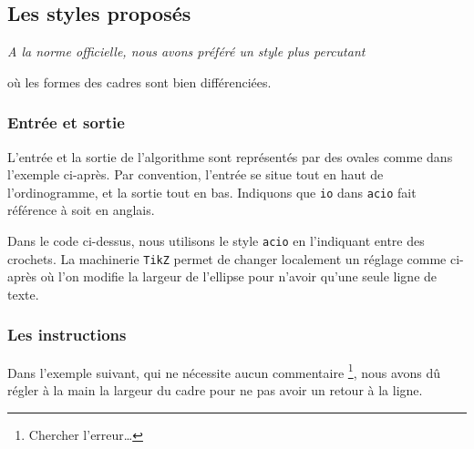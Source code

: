 \documentclass[12pt,a4paper]{article}
\begin{document}

\subsection{Les styles proposés}

\begin{frame-gene}
	\centering\itshape
	A la norme officielle, nous avons préféré un style plus percutant

	où les formes des cadres sont bien différenciées.
\end{frame-gene}




\subsubsection{Entrée et sortie}

L'entrée et la sortie de l'algorithme sont représentés par des ovales comme dans l'exemple ci-après. Par convention, l'entrée se situe tout en haut de l'ordinogramme, et la sortie tout en bas.
Indiquons que \verb+io+ dans \verb+acio+ fait référence à  soit  en anglais.


\vspace{-1em}

Dans le code ci-dessus, nous utilisons le style \verb+acio+ en l'indiquant entre des crochets.
La machinerie \verb+TikZ+ permet de changer localement un réglage comme ci-après où l'on modifie la largeur de l'ellipse pour n'avoir qu'une seule ligne de texte.





\subsubsection{Les instructions}

Dans l'exemple suivant, qui ne nécessite aucun commentaire
\footnote{
	Chercher l'erreur\dots
},
nous avons dû régler à la main la largeur du cadre pour ne pas avoir un retour à la ligne.
\end{document}
